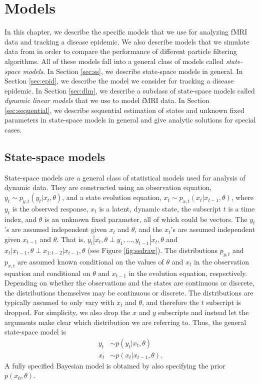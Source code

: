\chapter{Models \label{ch:models}}

In this chapter, we describe the specific models that we use for analyzing fMRI data and tracking a disease epidemic. We also describe models that we simulate data from in order to compare the performance of different particle filtering algorithms. All of these models fall into a general class of models called \emph{state-space models}. In Section \ref{sec:ss}, we describe state-space models in general. In Section \ref{sec:epid}, we describe the model we consider for tracking a disease epidemic. In Section \ref{sec:dlm}, we describe a subclass of state-space models called \emph{dynamic linear models} that we use to model fMRI data. In Section \ref{sec:sequential}, we describe sequential estimation of states and unknown fixed parameters in state-space models in general and give analytic solutions for special cases.

\section{State-space models \label{sec:ss}}

State-space models are a general class of statistical models used for analysis of dynamic data.  They are constructed using an observation equation, $y_t \sim p_{y,t}(y_t|x_t,\theta)$, and a state evolution equation, $x_t \sim p_{x,t}(x_t|x_{t-1},\theta)$, where $y_t$ is the observed response, $x_t$ is a latent, dynamic state, the subscript $t$ is a time index, and $\theta$ is an unknown fixed parameter, all of which could be vectors. The $y_t$'s are assumed independent given $x_t$ and $\theta$, and the $x_t$'s are assumed independent given $x_{t-1}$ and $\theta$. That is, $y_t|x_t,\theta \perp y_1,\ldots,y_{t-1}|x_t,\theta$ and $x_t|x_{t-1},\theta \perp x_{1:t-2}|x_{t-1},\theta$ (see Figure \ref{fig:ssdraw}). The distributions $p_{y,t}$ and $p_{x,t}$ are assumed known conditional on the values of $\theta$ and $x_t$ in the observation equation and conditional on $\theta$ and $x_{t-1}$ in the evolution equation, respectively. Depending on whether the observations and the states are continuous or discrete, the distributions themselves may be continuous or discrete. The distributions are typically assumed to only vary with $x_t$ and $\theta$, and therefore the $t$ subscript is dropped. For simplicity, we also drop the $x$ and $y$ subscripts and instead let the arguments make clear which distribution we are referring to. Thus, the general state-space model is
\begin{align}
y_t &\sim p(y_t|x_t,\theta) \label{eqn:obs} \\
x_t &\sim p(x_t|x_{t-1},\theta). \label{eqn:state}
\end{align}
A fully specified Bayesian model is obtained by also specifying the prior $p(x_0,\theta)$.

